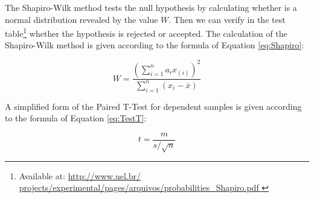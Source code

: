 The Shapiro-Wilk method tests the null hypothesis by calculating whether is a normal distribution revealed by the value $W$.
Then we can verify in the test table\footnote{Available at: \url{ http://www.uel.br/ projects/experimental/pages/arquivos/probabilities\_Shapiro.pdf }} whether the hypothesis is rejected or accepted.
The calculation of the Shapiro-Wilk method is given according to the formula of Equation \ref{eq:Shapiro}:

\begin{equation}
\label{eq:Shapiro}
W = \frac{\left(\sum_{i=1}^{n} a_ix_{(i)}\right)^2}{\sum_{i=1}^{n}\left(x_i -\overline{x}\right)} 
\end{equation}

A simplified form of the Paired T-Test for dependent samples
is given according to the formula of Equation \ref{eq:TestT}:

\begin{equation}
\label{eq:TestT}
t = \frac{m}{s/\sqrt{n}} 
\end{equation}

